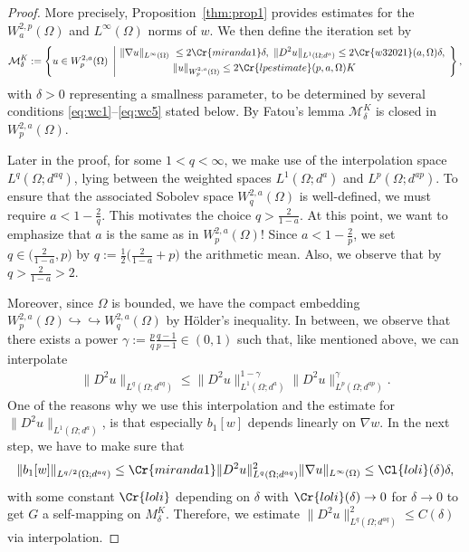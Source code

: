 \documentclass[12pt,a4paper,twoside]{article}
\newcommand{\M}{\mathcal {M}}
\begin{document}
\begin{proof}
More precisely, Proposition~\ref{thm:prop1} provides estimates for the $W^{2,p}_a(\Omega)$ and $ L^\infty(\Omega)$ norms of $w$. 
We then define the iteration set by
\begin{align*}
   \M_\delta^K := \left\{ u \in W^{2,a}_p(\Omega) \ \left| \
   \begin{aligned}
     \|\nabla u\|_{L^\infty(\Omega)} &\ \le 2 \Cr{miranda1} \delta, \ 
     \|D^2u\|_{L^1(\Omega;d^{a})}\le 2\Cr{w32021}(a,\Omega) \delta, \\  
     &\ \|u\|_{W^{2,a}_p(\Omega)} \le 2\Cr{lpestimate}(p,a,\Omega) K         
   \end{aligned}\
   \right.\right\},
\end{align*}
with $\delta>0$ representing a smallness parameter, to be determined by several conditions \eqref{eq:wc1}–\eqref{eq:wc5} stated below. By Fatou's lemma 
$\M_\delta^K $ is closed in $W^{2,a}_p(\Omega)$.

Later in the proof, for some $1<q<\infty$, we make use of  the interpolation space $L^q(\Omega; d^{aq})$, lying between the weighted spaces $L^1(\Omega; d^a)$ and $L^p(\Omega; d^{ap})$.  To ensure that the associated Sobolev space $W^{2,a}_q(\Omega)$ is well-defined, we must require 
 $a<1-\frac{2}{q}$. This motivates the choice $q> \frac{2}{1-a}$. At this point, we want to emphasize that $a$ is the same  as in $W^{2,a}_p(\Omega) $!
Since $a<1-\frac{2}{p}$, we set $ q\in\big(\frac{2}{1-a},p\big)$ by $q:= \frac{1}{2}\big(\frac{2}{1-a} + p\big)$ the arithmetic mean. 
Also, we observe that by $q> \frac{2}{1-a}>2$.

Moreover, since $\Omega$ is bounded, we have the compact embedding $W^{2,a}_p(\Omega) \hookrightarrow\hookrightarrow W^{2,a}_q(\Omega)  $ by Hölder's inequality.
In between,  we observe that there exists a power $\gamma:=\frac{p}{q}\frac{q-1}{p-1}\in(0,1)$ such that, like mentioned above, we can interpolate
\begin{align}
    \|D^2u\|_{L^q(\Omega;d^{aq})}\le \|D^2u\|_{L^1(\Omega;d^{a})} ^{1-\gamma}\|D^2u\|_{L^p(\Omega;d^{ap})} ^{\gamma}.\label{eq:int2L}
\end{align}
One of the reasons why we use this interpolation and the estimate for $ \|D^2u\|_{L^1(\Omega;d^{a})}$, is that especially $b_1[w]$  depends linearly on $\nabla w$. In the next step, we have to make sure that
\begin{align*}
    \|b_1[w] \|_{L^{q/2}(\Omega ;d^{aq})}  \le \Cr{miranda1}
     \|D^2 u \|^2_{L^{q}(\Omega ;d^{aq})} \|\nabla u\|_{L^\infty(\Omega)}\le \Cl{loli}(\delta) \delta,
\end{align*}
with some constant $\Cr{loli}$ depending on $\delta $ with $\Cr{loli}(\delta)\to 0$ for $\delta\to 0$ to get $G$ a self-mapping on $M_\delta^K$. Therefore, we estimate $\|D^2 u \|^2_{L^{q}(\Omega ;d^{aq})}\le C(\delta)$ via interpolation.
 

\end{proof}
\end{document}
